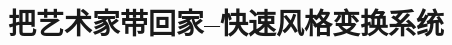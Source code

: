\documentclass[cs6size,a4paper]{ctexart}
\begin{document}
%
%
\pagestyle{plain}
\title{把艺术家带回家--快速风格变换系统}
\date{}

\pagestyle{fancy}
%
%
%
%
%
%
\end{document}
